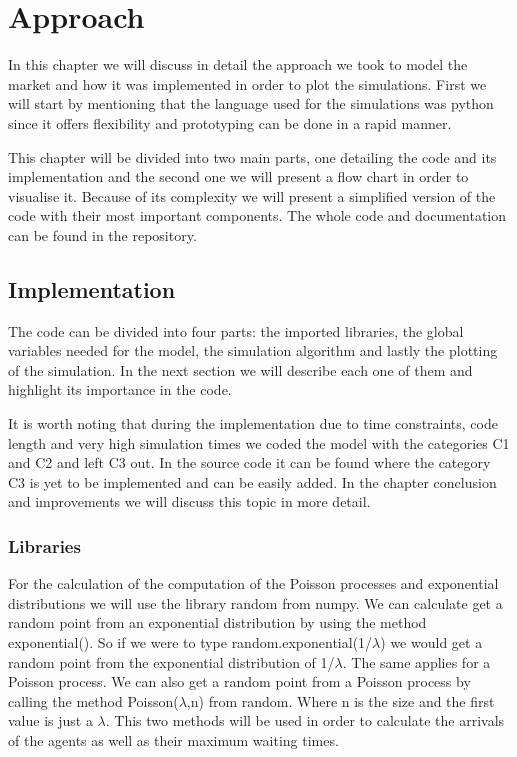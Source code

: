 \chapter{Approach}
In this chapter we will discuss in detail the approach we took to model the market and how it was implemented in order to plot the simulations. First we will start by mentioning that the language used for the simulations was python since it offers flexibility and prototyping can be done in a rapid manner. 

This chapter will be divided into two main parts, one detailing the code and its implementation and the second one we will present a flow chart in order to visualise it. Because of its complexity we will present a simplified version of the code with their most important components. The whole code and documentation can be found in the repository.


\section{Implementation}

The code can be divided into four parts: the imported libraries, the global variables needed for the model, the simulation algorithm and lastly the plotting of the simulation. In the next section we will describe each one of them and highlight its importance in the code.

It is worth noting that during the implementation due to time constraints, code length and very high simulation times we coded the model with the categories C1 and C2 and left C3 out. In the source code it can be found where the category C3 is yet to be implemented and can be easily added. In the chapter conclusion and improvements we will discuss this topic in more detail.

\subsection{Libraries}

For the calculation of the computation of the Poisson processes and exponential distributions we will use the library random from numpy. We can calculate get a random point from an exponential distribution by using the method exponential(). So if we were to type random.exponential(1/$\lambda$) we would get a random point from the exponential distribution of 1/$\lambda$. The same applies for a Poisson process. We can also get a random point from a Poisson process by calling the method Poisson($\lambda$,n) from random. Where n is the size and the first value is just a $\lambda$. This two methods will be used in order to calculate the arrivals of the agents as well as their maximum waiting times. 

